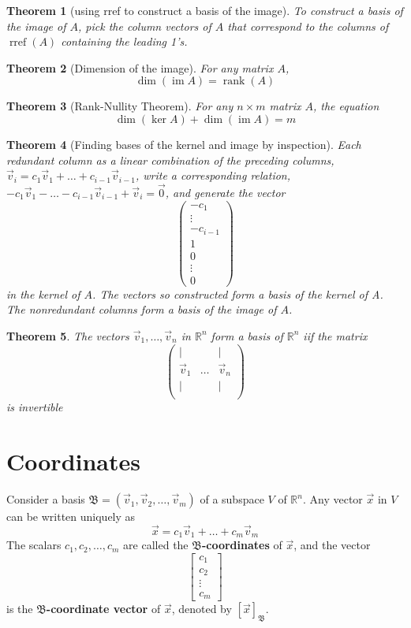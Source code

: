 \documentclass[letter]{article}
\newcommand{\R}{\mathbb{R}}
\newcommand{\B}{\mathfrak{B}}
\newcommand{\im}{\operatorname{im}}
\newcommand{\rank}{\operatorname{rank}}
\newtheorem{theorem}{Theorem}[section]
\newenvironment{definition}[1][Definition]{\begin{trivlist}
\item[\hskip \labelsep {\bfseries #1}]}{\end{trivlist}}
\begin{document}
\begin{theorem}[using rref to construct a basis of the image]
To construct a basis of the image of $A$, pick the column vectors of $A$ that correspond to the columns of $\operatorname{rref}(A)$ containing the leading 1's.
\end{theorem}

\begin{theorem}[Dimension of the image]
For any matrix $A$,
\[
\dim(\operatorname{im} A) = \rank(A)
\]
\end{theorem}

\begin{theorem}[Rank-Nullity Theorem]
For any $n\times m$ matrix $A$, the equation
\[
\dim(\operatorname{ker} A) + \dim(\im A) = m
\]
\end{theorem}

\begin{theorem}[Finding bases of the kernel and image by inspection]
Each redundant column as a linear combination of the preceding columns, $\vec v_i = c_1 \vec v_1 + \ldots + c_{i-1} \vec v_{i-1}$, write a corresponding relation, $-c_1\vec v_1 - \ldots - c_{i-1}\vec v_{i-1} + \vec v_i = \vec 0$, and generate the vector
\[
\begin{pmatrix}
-c_1\\
\vdots\\
-c_{i-1}\\
1\\
0\\
\vdots\\
0
\end{pmatrix}
\]
in the kernel of $A$. The vectors so constructed form a basis of the kernel of A. The nonredundant columns form a basis of the image of $A$.
\end{theorem}

\begin{theorem}
The vectors $\vec v_1, \ldots, \vec v_n$ in $\R^n$ form a basis of $\R^n$ iif the matrix
\[
\begin{pmatrix}
|& & |\\
\vec v_1& \ldots & \vec v_n\\
|& & |\\
\end{pmatrix}
\]
is invertible
\end{theorem}

\section{Coordinates}
\begin{definition}
Consider a basis $\B= (\vec v_1, \vec v_2, \ldots, \vec v_m)$ of a subspace $V$ of $\R^n$. Any vector $\vec x$ in $V$ can be written uniquely as
\[
\vec x = c_1\vec v_1 + \ldots + c_m\vec v_m
\]
The scalars $c_1, c_2, \ldots, c_m$ are called the \textbf{$\B$-coordinates} of $\vec x$, and the vector
\[
\begin{bmatrix}
c_1\\
c_2\\
\vdots\\
c_m
\end{bmatrix}
\]
is the \textbf{$\B$-coordinate vector} of $\vec x$, denoted by $[\vec x]_\B$.
\end{definition}
\end{document}
